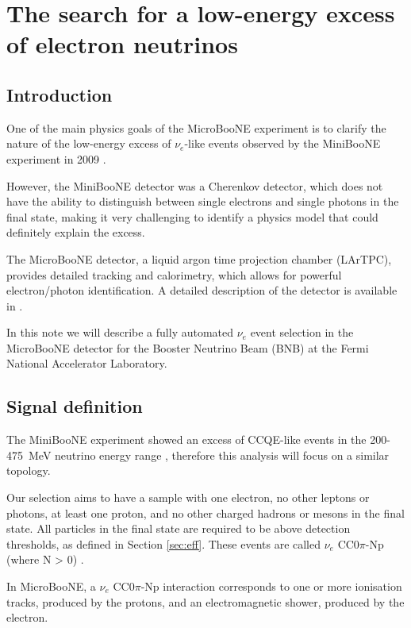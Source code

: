 \chapter{The search for a low-energy excess of electron neutrinos}

\minitoc

\section{Introduction}
One of the main physics goals of the MicroBooNE experiment is to clarify the nature of the low-energy excess of $\nu_{e}$-like events observed by the MiniBooNE experiment in 2009 \cite{miniboone}. 

However, the MiniBooNE detector was a Cherenkov detector, which does not have the ability to distinguish between single electrons and single photons in the final state, making it very challenging to identify a physics model that  could definitely explain the excess.

The MicroBooNE detector, a liquid argon time projection chamber (LArTPC), provides detailed tracking and calorimetry, which allows for powerful electron/photon identification. A detailed description of the detector is available in \cite{detector}.

In this note we will describe a fully automated $\nu_{e}$ event selection in the MicroBooNE detector for the Booster Neutrino Beam (BNB) at the Fermi National Accelerator Laboratory.

\section{Signal definition}
The MiniBooNE experiment showed an excess of CCQE-like events in the 200-475~MeV neutrino energy range \cite{miniboone}, therefore this analysis will focus on a similar topology.

Our selection aims to have a sample with one electron, no other leptons or photons, at least one proton, and no other charged hadrons or mesons in the final state. All particles in the final state are required to be above detection thresholds, as defined in Section \ref{sec:eff}. These events are called $\nu_{e}$ CC0$\pi$-Np (where N > 0) \cite{teppei}.

In MicroBooNE, a $\nu_{e}$ CC0$\pi$-Np interaction corresponds to one or more ionisation tracks, produced by the protons, and an electromagnetic shower, produced by the electron. 






